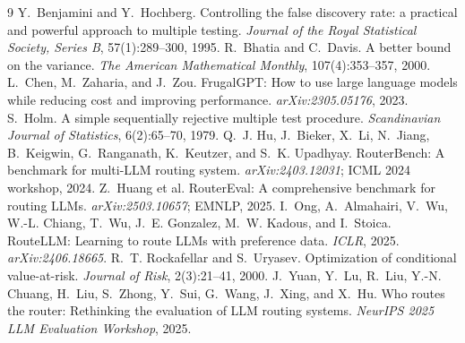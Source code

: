 \documentclass[10pt]{article}
\begin{document}

\begin{thebibliography}{9}
 Y.~Benjamini and Y.~Hochberg. Controlling the false discovery rate: a practical and powerful approach to multiple testing. \emph{Journal of the Royal Statistical Society, Series B}, 57(1):289--300, 1995.
 R.~Bhatia and C.~Davis. A better bound on the variance. \emph{The American Mathematical Monthly}, 107(4):353--357, 2000.
 L.~Chen, M.~Zaharia, and J.~Zou. FrugalGPT: How to use large language models while reducing cost and improving performance. \emph{arXiv:2305.05176}, 2023.
 S.~Holm. A simple sequentially rejective multiple test procedure. \emph{Scandinavian Journal of Statistics}, 6(2):65--70, 1979.
 Q.~J. Hu, J.~Bieker, X.~Li, N.~Jiang, B.~Keigwin, G.~Ranganath, K.~Keutzer, and S.~K. Upadhyay. RouterBench: A benchmark for multi-LLM routing system. \emph{arXiv:2403.12031}; ICML 2024 workshop, 2024.
 Z.~Huang et al. RouterEval: A comprehensive benchmark for routing LLMs. \emph{arXiv:2503.10657}; EMNLP, 2025.
 I.~Ong, A.~Almahairi, V.~Wu, W.-L. Chiang, T.~Wu, J.~E. Gonzalez, M.~W. Kadous, and I.~Stoica. RouteLLM: Learning to route LLMs with preference data. \emph{ICLR}, 2025. \emph{arXiv:2406.18665}.
 R.~T. Rockafellar and S.~Uryasev. Optimization of conditional value-at-risk. \emph{Journal of Risk}, 2(3):21--41, 2000.
 J.~Yuan, Y.~Lu, R.~Liu, Y.-N. Chuang, H.~Liu, S.~Zhong, Y.~Sui, G.~Wang, J.~Xing, and X.~Hu. Who routes the router: Rethinking the evaluation of LLM routing systems. \emph{NeurIPS 2025 LLM Evaluation Workshop}, 2025.
\end{thebibliography}

\appendix

\end{document}
